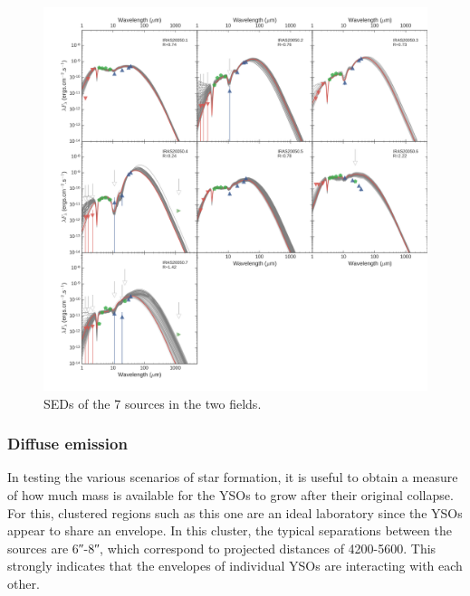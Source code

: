 \begin{figure}
\begin{center}
\includegraphics[width=\textwidth]{Figures/IRAS20050_SEDs.png}
\caption[IRAS20050+2720 SEDs]{SEDs of the 7 sources in the two fields. }
\label{fig:IRAS20050_SEDs}
\end{center}
\end{figure}

\subsubsection{Diffuse emission}
In testing the various scenarios of star formation, it is useful to obtain a measure of how much mass is available for the YSOs to grow after their original collapse. For this, clustered regions such as this one are an ideal laboratory since the YSOs appear to share an envelope. In this cluster, the typical separations between the sources are \ang{;;6}-\ang{;;8}, which correspond to projected distances of \num{4200}-\SI{5600}{\au}. This strongly indicates that the envelopes of individual YSOs are interacting with each other.

